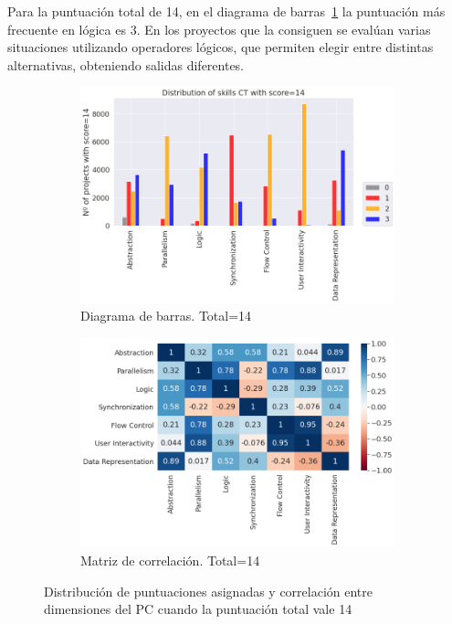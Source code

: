 \documentclass[a4paper, 12pt]{book}
\begin{document}
Para la puntuación total de 14, en el diagrama de barras~\ref{fig:total14} la puntuación más frecuente en lógica es 3. En los proyectos que la consiguen 
se evalúan varias situaciones utilizando operadores lógicos, que permiten elegir entre distintas alternativas, obteniendo salidas diferentes.

\begin{figure}[H]
    \centering
    \begin{subfigure}[h]{.49\textwidth} 
        \includegraphics[width=\textwidth]{img/distribucion_14_Scratch}
        \caption{Diagrama de barras. Total=14}
        \label{fig:total14}
    \end{subfigure}       
    \begin{subfigure}[h]{.49\textwidth} 
        \includegraphics[width=\textwidth]{img/corr_14_Scratch}
        \caption{Matriz de correlación. Total=14}
        \label{fig:corr14}
    \end{subfigure}
     \caption{Distribución de puntuaciones asignadas y correlación entre dimensiones del PC cuando la puntuación total vale 14}
\end{figure}
\end{document}
